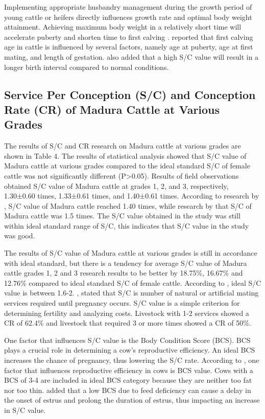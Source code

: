 \documentclass[9pt,article,twoside]{fapet-rho-class/fapet-rho}
\begin{document}
Implementing appropriate husbandry management during the growth period of young cattle or heifers directly influences growth rate and optimal body weight attainment. Achieving maximum body weight in a relatively short time will accelerate puberty and shorten time to first calving \citep{Sumiyanti2023}. \citet{Napitupulu2024} reported that first calving age in cattle is influenced by several factors, namely age at puberty, age at first mating, and length of gestation. \citet{Hartatik2009} also added that a high S/C value will result in a longer birth interval compared to normal conditions.

\subsection{Service Per Conception (S/C) and Conception Rate (CR) of Madura Cattle at Various Grades}

The results of S/C and CR research on Madura cattle at various grades are shown in Table 4. The results of statistical analysis showed that S/C value of Madura cattle at various grades compared to the ideal standard S/C of female cattle was not significantly different (P>0.05). Results of field observations obtained S/C value of Madura cattle at grades 1, 2, and 3, respectively, 1.30±0.60 times, 1.33±0.61 times, and 1.40±0.61 times. According to research by \citet{Kutsiyah2018}, S/C value of Madura cattle reached 1.40 times, while research by \citet{Wulansari2023} that S/C of Madura cattle was 1.5 times. The S/C value obtained in the study was still within ideal standard range of S/C, this indicates that S/C value in the study was good.

The results of S/C value of Madura cattle at various grades is still in accordance with ideal standard, but there is a tendency for average S/C value of Madura cattle grades 1, 2 and 3 research results to be better by 18.75\%, 16.67\% and 12.76\% compared to ideal standard S/C of female cattle. According to \citet{Tophianong2023}, ideal S/C value is between 1.6-2. \citet{Khan2015}, stated that S/C is number of natural or artificial mating services required until pregnancy occurs. S/C value is a simple criterion for determining fertility and analyzing costs. Livestock with 1-2 services showed a CR of 62.4\% and livestock that required 3 or more times showed a CR of 50\%.

One factor that influences S/C value is the Body Condition Score (BCS). BCS plays a crucial role in determining a cow's reproductive efficiency. An ideal BCS increases the chance of pregnancy, thus lowering the S/C rate. According to \citet{Harmayani2023}, one factor that influences reproductive efficiency in cows is BCS value. Cows with a BCS of 3-4 are included in ideal BCS category because they are neither too fat nor too thin. \citet{Putra2023} added that a low BCS due to feed deficiency can cause a delay in the onset of estrus and prolong the duration of estrus, thus impacting an increase in S/C value.
\end{document}
